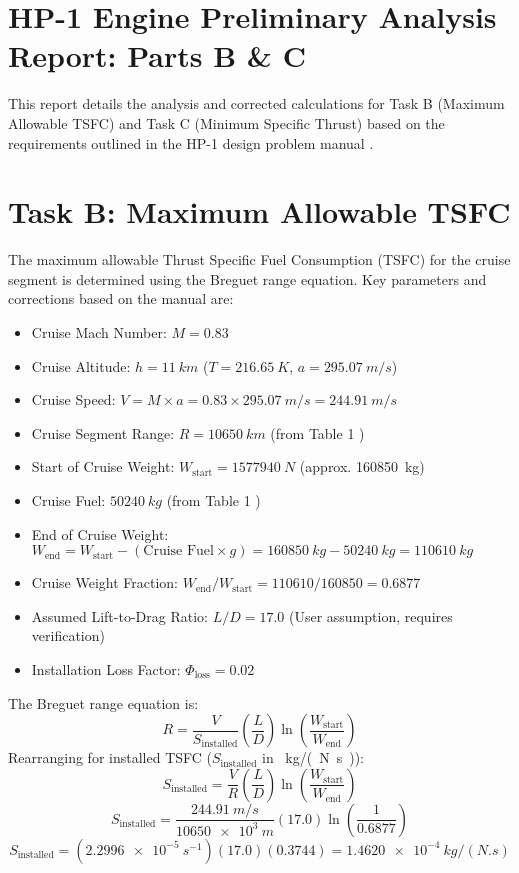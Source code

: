 \documentclass{article}
\begin{document}
\section*{HP-1 Engine Preliminary Analysis Report: Parts B \& C}

This report details the analysis and corrected calculations for Task B (Maximum Allowable TSFC) and Task C (Minimum Specific Thrust) based on the requirements outlined in the HP-1 design problem manual \cite{manual}.

\section{Task B: Maximum Allowable TSFC}

The maximum allowable Thrust Specific Fuel Consumption (TSFC) for the cruise segment is determined using the Breguet range equation. Key parameters and corrections based on the manual are:
\begin{itemize}
    \item Cruise Mach Number: $M = 0.83$
    \item Cruise Altitude: $h = \SI{11}{km}$ ($T = \SI{216.65}{K}$, $a = \SI{295.07}{m/s}$)
    \item Cruise Speed: $V = M \times a = 0.83 \times \SI{295.07}{m/s} = \SI{244.91}{m/s}$
    \item Cruise Segment Range: $R = \SI{10650}{km}$ (from Table 1 \cite{manual})
    \item Start of Cruise Weight: $W_{\text{start}} = \SI{1577940}{N}$ (approx. \SI{160850}{kg}) \cite{manual}
    \item Cruise Fuel: $\SI{50240}{kg}$ (from Table 1 \cite{manual})
    \item End of Cruise Weight: $W_{\text{end}} = W_{\text{start}} - (\text{Cruise Fuel} \times g) = \SI{160850}{kg} - \SI{50240}{kg} = \SI{110610}{kg}$
    \item Cruise Weight Fraction: $W_{\text{end}} / W_{\text{start}} = 110610 / 160850 = 0.6877$
    \item Assumed Lift-to-Drag Ratio: $L/D = 17.0$ (User assumption, requires verification)
    \item Installation Loss Factor: $\Phi_{\text{loss}} = 0.02$ \cite{manual}
\end{itemize}

The Breguet range equation is:
\[ R = \frac{V}{S_{\text{installed}}} \left( \frac{L}{D} \right) \ln \left( \frac{W_{\text{start}}}{W_{\text{end}}} \right) \]
Rearranging for installed TSFC ($S_{\text{installed}}$ in \SI{}{kg/(N.s)}):
\[ S_{\text{installed}} = \frac{V}{R} \left( \frac{L}{D} \right) \ln \left( \frac{W_{\text{start}}}{W_{\text{end}}} \right) \]
\[ S_{\text{installed}} = \frac{\SI{244.91}{m/s}}{\SI{10650e3}{m}} (17.0) \ln \left( \frac{1}{0.6877} \right) \]
\[ S_{\text{installed}} = (\SI{2.2996e-5}{s^{-1}}) (17.0) (0.3744) = \SI{1.4620e-4}{kg/(N.s)} \]
\end{document}
